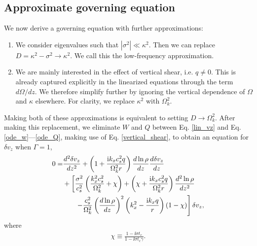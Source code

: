 \subsection{Approximate governing equation}\label{approx_gov}
We now derive a governing equation with further approximations:
\begin{enumerate}
\item We consider eigenvalues such that
  $|\sigma^2|\ll \kappa^2$. Then we can replace $D=\kappa^2 -\sigma^2\to
  \kappa^2$. %
  We call this the
  low-frequency approximation. 
\item We are mainly interested in the effect of vertical shear, i.e. $q\neq
  0$. This is already captured explicitly in the linearized equations through
  the term $d\Omega/dz$. We therefore simplify
  further by ignoring the vertical dependence of $\Omega$ and $\kappa$
  elsewhere. For clarity, we replace $\kappa^2$ with $\Omega_k^2$. 
  
\end{enumerate}
Making both of these approximations is equivalent to setting 
$D\to\Omega_k^2$.  After making this replacement, we eliminate $W$ and
$Q$ between  Eq. \ref{lin_vz} and Eq. \ref{ode_w}---\ref{ode_Q},
making use of Eq. \ref{vertical_shear}, to
obtain an equation for $\delta v_z$ when $\Gamma=1$,
\begin{align}
  0 =& \frac{d^2\delta v_z}{dz^2} + \left(1 + \frac{\mathrm{i} k_x c_s^2
      q}{\Omega_k^2r}\right)\frac{d\ln\rho}{dz}\frac{d\delta
    v_z}{dz} \notag\\
  &+ \left[\frac{\sigma^2}{c_s^2}\left(\frac{k_x^2c_s^2}{\Omega_k^2} +
      \chi\right) + \left(\chi + \frac{\mathrm{i} k_x c_s^2
        q}{\Omega_k^2r}\right)\frac{d^2\ln\rho}{dz^2}\right. \notag\\
  &\phantom{+=}\left.-
    \frac{c_s^2}{\Omega_k^2}\left(\frac{d\ln\rho}{dz}\right)^2\left(k_x^2 -
      \frac{\mathrm{i} k_x q}{r}\right)
    \left(1-\chi\right) 
  \right]\delta v_z,\label{vertiso_gov}
\end{align}
where
\begin{align}
  \chi \equiv \frac{1-\ii\sigma t_c}{1-\ii\sigma t_c\gamma}.
\end{align}

